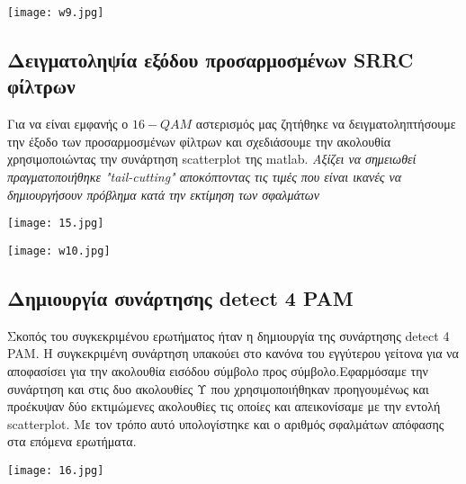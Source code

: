 \documentclass[11pt]{article}
\begin{document}
\begin{center}
	\texttt{[image: w9.jpg]}
\end{center}

\subsection{Δειγματοληψία εξόδου προσαρμοσμένων \foreignlanguage{english}{SRRC} φίλτρων}

Για να είναι εμφανής ο $16-QAM$ αστερισμός μας ζητήθηκε να δειγματοληπτήσουμε την έξοδο των προσαρμοσμένων φίλτρων και σχεδιάσουμε την ακολουθία χρησιμοποιώντας την συνάρτηση \foreignlanguage{english}{scatterplot} της \foreignlanguage{english}{matlab}. \textit{Αξίζει να σημειωθεί πραγματοποιήθηκε "\foreignlanguage{english}{tail-cutting}" αποκόπτοντας τις τιμές που είναι ικανές να δημιουργήσουν πρόβλημα κατά την εκτίμηση των σφαλμάτων}

\begin{center}
	\texttt{[image: 15.jpg]}
\end{center}

\begin{center}
	\texttt{[image: w10.jpg]}
\end{center}

\subsection{Δημιουργία συνάρτησης \foreignlanguage{english}{detect 4 PAM}}
Σκοπός του συγκεκριμένου ερωτήματος ήταν η δημιουργία της συνάρτησης \foreignlanguage{english}{detect 4 PAM}. Η συγκεκριμένη συνάρτηση υπακούει στο κανόνα του εγγύτερου γείτονα για να αποφασίσει για την ακολουθία εισόδου σύμβολο προς σύμβολο.Εφαρμόσαμε την συνάρτηση και στις δυο ακολουθίες Υ που χρησιμοποιήθηκαν προηγουμένως και προέκυψαν δύο εκτιμώμενες ακολουθίες τις οποίες και απεικονίσαμε με την εντολή \foreignlanguage{english}{scatterplot}. Με τον τρόπο αυτό υπολογίστηκε και ο αριθμός σφαλμάτων απόφασης στα επόμενα ερωτήματα.

\begin{center}
	\texttt{[image: 16.jpg]}
\end{center}
\end{document}
